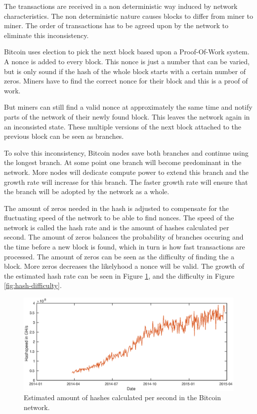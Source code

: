 The transactions are received in a non deterministic way induced by network characteristics.
The non deterministic nature causes blocks to differ from miner to miner.
The order of transactions has to be agreed upon by the network to eliminate this inconsistency.

Bitcoin uses election to pick the next block based upon a Proof-Of-Work system.
A nonce is added to every block.
This nonce is just a number that can be varied,
but is only sound if the hash of the whole block starts with a certain number of zeros.
Miners have to find the correct nonce for their block and this is a proof of work.

But miners can still find a valid nonce at approximately the same time
and notify parts of the network of their newly found block.
This leaves the network again in an inconsisted state.
These multiple versions of the next block attached to the previous block can be seen as branches.

To solve this inconsistency, Bitcoin nodes save both branches and continue using the longest branch.
At some point one branch will become predominant in the network.
More nodes will dedicate compute power to extend this branch and the growth rate will increase for this branch.
The faster growth rate will ensure that the branch will be adopted by the network as a whole.

The amount of zeros needed in the hash is adjusted to compensate for the fluctuating speed of the network to be able to find nonces.
The speed of the network is called the hash rate and is the amount of hashes calculated per second.
The amount of zeros balances the probability of branches occuring
and the time before a new block is found,
which in turn is how fast transactions are processed.
The amount of zeros can be seen as the difficulty of finding the a block.
More zeros decreases the likelyhood a nonce will be valid.
The growth of the estimated hash rate can be seen in Figure \ref{fig:hash-speed},
and the difficulty in Figure \ref{fig:hash-difficulty}.

\begin{figure}
        \centerline{\includegraphics[scale=0.6]{relatedWork/figs/hashspeed/hashspeed.eps}}
        \caption{Estimated amount of hashes calculated per second in the Bitcoin network.\cite{Blockchain.info-hashspeed}}
	\label{fig:hash-speed}
\end{figure}

